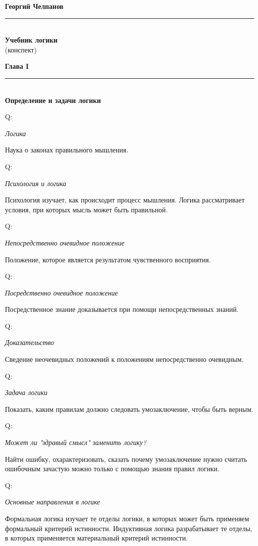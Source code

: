 \documentclass{article}
\renewcommand{\section}[2]{
	\vspace{6em}
	\begin{flushright}
		\Large
		\baselineskip=0.5\baselineskip
		\textbf{#1}
		\\
		\rule[0.5\baselineskip]{\textwidth}{0.15pt}
		\\
		\textbf{#2}
	\end{flushright}
}
\renewcommand{\title}[2]{
	\begin{center}
		\LARGE
		\baselineskip=0.5\baselineskip
		\textbf{#1}
		\\
		\rule[0.5\baselineskip]{0.7\textwidth}{0.15pt}
		\\
		\textbf{#2}
		\\\baselineskip=2\baselineskip(конспект)		
	\end{center}
}
\newcommand{\question}[2]{
	\begin{flushright}
		Q:\hspace{2ex}\vline\hspace{2ex}
		\begin{minipage}{0.9\textwidth}
			\large
			\textit{#1}
		\end{minipage}
	\end{flushright}
	\begin{center}
		\begin{minipage}{0.95\textwidth}
			#2
		\end{minipage}
	\end{center}
}
\begin{document}
\title{Георгий Челпанов}{Учебник логики}
\section{Глава I}{Определение и задачи логики}
\question{Логика}{Наука о законах правильного мышления.}
\question{Психология и логика}{Психология изучает, как происходит процесс мышления. Логика рассматривает условия, при которых мысль может быть правильной.}
\question{Непосредственно очевидное положение}{Положение, которое является результатом чувственного восприятия.}
\question{Посредственно очевидное положение}{Посредственное знание доказывается при помощи непосредственных знаний.}
\question{Доказательство}{Сведение неочевидных положений к положениям непосредственно очевидным.}
\question{Задача логики}{Показать, каким правилам должно следовать умозаключение, чтобы быть верным.}
\question{Может ли "здравый смысл" заменить логику?}{Найти ошибку, охарактеризовать, сказать почему умозаключение нужно считать ошибочным зачастую можно только с помощью знания правил логики.}
\question{Основные направления в логике}{Формальная логика изучает те отделы логики, в которых может быть применяем формальный критерий истинности. Индуктивная логика разрабатывает те отделы, в которых применяется материальный критерий истинности.}
\end{document}
